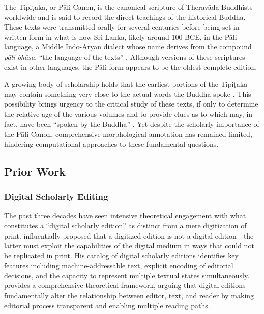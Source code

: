 \documentclass[unnumsec,webpdf,contemporary,large]{oup-authoring-template}
\begin{document}
The Tipiṭaka, or Pāli Canon, is the canonical scripture of Theravāda Buddhists worldwide and is said to record the direct teachings of the historical Buddha. These texts were transmitted orally for several centuries before being set in written form in what is now Sri Lanka, likely around 100 BCE, in the Pāli language, a Middle Indo-Aryan dialect whose name derives from the compound \emph{pāli-bhāsa}, ``the language of the texts'' \citep[xxiii]{geiger2005}. Although versions of these scriptures exist in other languages, the Pāli form appears to be the oldest complete edition.

A growing body of scholarship holds that the earliest portions of the Tipiṭaka may contain something very close to the actual words the Buddha spoke \citep{sujato2014,gombrich2018}. This possibility brings urgency to the critical study of these texts, if only to determine the relative age of the various volumes and to provide clues as to which may, in fact, have been ``spoken by the Buddha'' \citep[7]{sujato2014}. Yet despite the scholarly importance of the Pāli Canon, comprehensive morphological annotation has remained limited, hindering computational approaches to these fundamental questions.

\subsection{Prior Work}

\subsubsection{Digital Scholarly Editing}

The past three decades have seen intensive theoretical engagement with what constitutes a ``digital scholarly edition'' as distinct from a mere digitization of print. \citet{sahle2016} influentially proposed that a digitized edition is not a digital edition---the latter must exploit the capabilities of the digital medium in ways that could not be replicated in print. His catalog of digital scholarly editions identifies key features including machine-addressable text, explicit encoding of editorial decisions, and the capacity to represent multiple textual states simultaneously. \citet{pierazzo2015} provides a comprehensive theoretical framework, arguing that digital editions fundamentally alter the relationship between editor, text, and reader by making editorial process transparent and enabling multiple reading paths.
\end{document}
